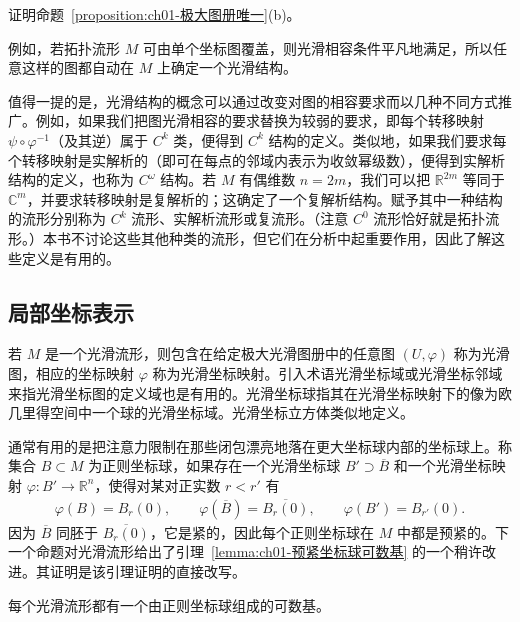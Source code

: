 \documentclass[../../main.tex]{subfiles}
\begin{document}
\begin{exercise}\label{exercise:ch01-1.18}
证明命题~\cref{proposition:ch01-极大图册唯一}(b)。
\end{exercise}

例如，若拓扑流形 $M$ 可由单个坐标图覆盖，则光滑相容条件平凡地满足，所以任意这样的图都自动在 $M$ 上确定一个光滑结构。

值得一提的是，光滑结构的概念可以通过改变对图的相容要求而以几种不同方式推广。例如，如果我们把图光滑相容的要求替换为较弱的要求，即每个转移映射 $\psi\circ\varphi^{-1}$（及其逆）属于 $C^{k}$ 类，便得到 $C^{k}$ 结构的定义。类似地，如果我们要求每个转移映射是实解析的（即可在每点的邻域内表示为收敛幂级数），便得到实解析结构的定义，也称为 $C^{\omega}$ 结构。若 $M$ 有偶维数 $n=2m$，我们可以把 $\mathbb{R}^{2m}$ 等同于 $\mathbb{C}^{m}$，并要求转移映射是复解析的；这确定了一个复解析结构。赋予其中一种结构的流形分别称为 $C^{k}$ 流形、实解析流形或复流形。（注意 $C^{0}$ 流形恰好就是拓扑流形。）本书不讨论这些其他种类的流形，但它们在分析中起重要作用，因此了解这些定义是有用的。

\subsection{局部坐标表示}\label{subsection:ch01-局部坐标表示}

若 $M$ 是一个光滑流形，则包含在给定极大光滑图册中的任意图 $(U,\varphi)$ 称为光滑图，相应的坐标映射 $\varphi$ 称为光滑坐标映射。引入术语光滑坐标域或光滑坐标邻域来指光滑坐标图的定义域也是有用的。光滑坐标球指其在光滑坐标映射下的像为欧几里得空间中一个球的光滑坐标域。光滑坐标立方体类似地定义。

通常有用的是把注意力限制在那些闭包漂亮地落在更大坐标球内部的坐标球上。称集合 $B\subset M$ 为正则坐标球，如果存在一个光滑坐标球 $B'\supset\overline{B}$ 和一个光滑坐标映射 $\varphi:B'\to\mathbb{R}^{n}$，使得对某对正实数 $r<r'$ 有
\begin{align*}
\varphi(B)=B_{r}(0),\qquad \varphi(\overline{B})=\overline{B_{r}(0)},\qquad \varphi(B')=B_{r'}(0).
\end{align*}
因为 $\overline{B}$ 同胚于 $\overline{B_{r}(0)}$，它是紧的，因此每个正则坐标球在 $M$ 中都是预紧的。下一个命题对光滑流形给出了引理~\cref{lemma:ch01-预紧坐标球可数基} 的一个稍许改进。其证明是该引理证明的直接改写。

\begin{proposition}\label{proposition:ch01-正则坐标球可数基}
每个光滑流形都有一个由正则坐标球组成的可数基。
\end{proposition}
\end{document}
